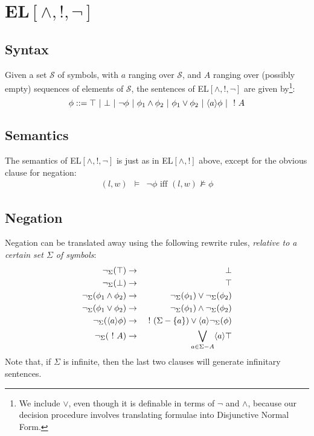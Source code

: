 \section{EL$[\land, !, \neg]$}


\subsection{Syntax}
Given a set $\mathcal{S}$ of symbols, with $a$ ranging over $\mathcal{S}$, and $A$ ranging over (possibly empty) sequences of elements of $\mathcal{S}$, the sentences of EL$[\land, !, \neg]$ are given by\footnote{We include $\lor$, even though it is definable in terms of $\neg$ and $\land$, because our decision procedure involves translating formulae into Disjunctive Normal Form.}:
\[
\phi ::= \top \ | \  \bot \ | \  \neg \phi \ | \  \phi_1 \land \phi_2 \ | \ \phi_1 \lor \phi_2 \ | \  \langle a \rangle \phi \ | \  \ ! \  A 
\]
\subsection{Semantics}

The semantics of EL$[\land, !, \neg]$ is just as in EL$[\land, !]$ above, except for the obvious clause for negation:
\begin{eqnarray}
(l,w) & \models & \neg \phi \mbox{ iff } (l,w) \nvDash \phi \nonumber
\end{eqnarray}

\subsection{Negation}
Negation can be translated away using the following rewrite rules, \emph{relative to a certain set $\Sigma$ of symbols}:
\begin{eqnarray}
\neg_\Sigma(\top) & \rightarrow & \bot \nonumber \\
\neg_\Sigma(\bot) & \rightarrow & \top \nonumber \\
\neg_\Sigma(\phi_1 \land \phi_2) & \rightarrow & \neg_\Sigma(\phi_1) \lor \neg_\Sigma(\phi_2) \nonumber \\
\neg_\Sigma(\phi_1 \lor \phi_2) & \rightarrow & \neg_\Sigma(\phi_1) \land \neg_\Sigma(\phi_2) \nonumber \\
\neg_\Sigma(\langle a \rangle \phi) & \rightarrow & \ ! \ (\Sigma-\{a\}) \lor \langle a \rangle \neg_\Sigma(\phi) \nonumber \\
\neg_\Sigma(\ ! \  A) & \rightarrow & \bigvee_{a \in \Sigma - A} \langle a \rangle \top\nonumber
\end{eqnarray}
Note that, if $\Sigma$ is infinite, then the last two clauses will generate infinitary sentences.

